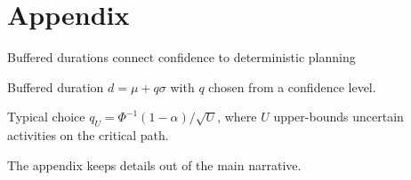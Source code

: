 \documentclass[aspectratio=169,10pt]{beamer}
\begin{document}
\appendix
\section{Appendix}

\begin{frame}{Buffered durations connect confidence to deterministic planning}
  \begin{block}{Buffered duration}
    \(d=\mu+q\sigma\) with \(q\) chosen from a confidence level.
  \end{block}
  \vspace{0.15cm}
  \begin{block}{Typical choice}
    \(q_U=\Phi^{-1}(1-\alpha)/\sqrt{U}\), where \(U\) upper-bounds uncertain activities on the critical path.
  \end{block}
  \scriptsize\color{darkgray}
  The appendix keeps details out of the main narrative.
\end{frame}
\end{document}
